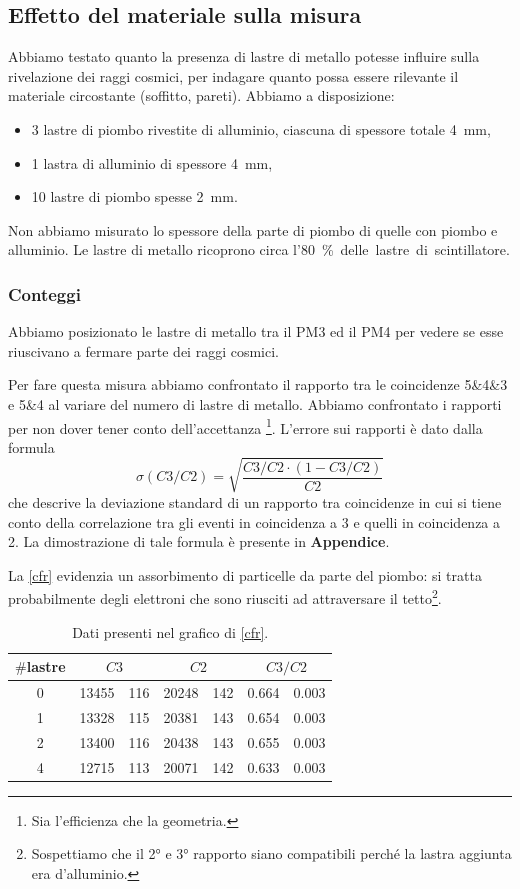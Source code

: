 \subsection{Effetto del materiale sulla misura}

Abbiamo testato quanto la presenza di lastre di metallo potesse influire sulla rivelazione dei raggi cosmici,
per indagare quanto possa essere rilevante il materiale circostante (soffitto, pareti).
Abbiamo a disposizione:
\begin{itemize}
	\item 3 lastre di piombo rivestite di alluminio, ciascuna di spessore totale \SI{4}{mm},
	\item 1 lastra di alluminio di spessore \SI{4}{mm},
	\item 10 lastre di piombo spesse \SI{2}{mm}.
\end{itemize}
Non abbiamo misurato lo spessore della parte di piombo di quelle con piombo e alluminio.
Le lastre di metallo ricoprono circa l'\SI{80}\% delle lastre di scintillatore. 

\subsubsection{Conteggi}

Abbiamo posizionato le lastre di metallo tra il PM3 ed il PM4
per vedere se esse riuscivano a fermare parte dei raggi cosmici.

Per fare questa misura abbiamo confrontato il rapporto tra le coincidenze 5\&4\&3 e 5\&4
al variare del numero di lastre di metallo.
Abbiamo confrontato i rapporti per non dover tener conto dell'accettanza%
\footnote{Sia l'efficienza che la geometria.}.
L'errore sui rapporti è dato dalla formula
$$ \sigma(C3/C2)= \sqrt{ \frac{C3/C2\cdot (1-C3/C2)}{C2} } $$
che descrive la deviazione standard di un rapporto tra coincidenze in cui si tiene conto della correlazione tra gli eventi in coincidenza a 3 e quelli in coincidenza a 2. La dimostrazione di tale formula è presente in \textbf{Appendice}.

La \autoref{cfr} evidenzia un assorbimento di particelle da parte del piombo: si tratta probabilmente degli elettroni che sono riusciti ad attraversare il tetto\footnote{Sospettiamo che il 2\si{\degree} e 3\si{\degree} rapporto siano compatibili perché la lastra aggiunta era d'alluminio.}.

\begin{table}
\centering
\begin{tabular}{| c | r @{\,$\pm$\,} l | r @{\,$\pm$\,} l | r @{\,$\pm$\,} l |}
\hline
$\#$lastre & \multicolumn{2}{c|}{$C3$} & \multicolumn{2}{c|}{$C2$} & \multicolumn{2}{c|}{$C3/C2$} \\ 
\hline
0 & 13455&116 & 20248&142 & 0.664&0.003 \\
1 & 13328&115 & 20381&143 & 0.654&0.003 \\
2 & 13400&116 & 20438&143 & 0.655&0.003 \\
4 & 12715&113 & 20071&142 & 0.633&0.003 \\
\hline
\end{tabular}
\caption{Dati presenti nel grafico di \autoref{cfr}.}
\label{dati cfr}
\end{table}


